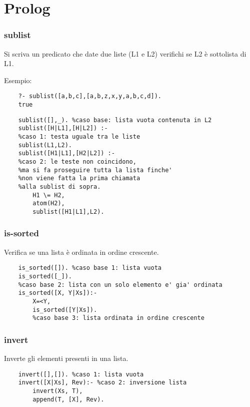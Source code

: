 \chapter{Prolog}

\subsection{sublist}

Si scriva un predicato che date due liste (L1 e L2) verifichi se L2 è sottolista di L1.

Esempio:

\begin{lstlisting}
    ?- sublist([a,b,c],[a,b,z,x,y,a,b,c,d]).
    true
\end{lstlisting}

\begin{lstlisting}
    sublist([],_). %caso base: lista vuota contenuta in L2
    sublist([H|L1],[H|L2]) :- 
    %caso 1: testa uguale tra le liste
    sublist(L1,L2).
    sublist([H1|L1],[H2|L2]) :- 
    %caso 2: le teste non coincidono, 
    %ma si fa proseguire tutta la lista finche' 
    %non viene fatta la prima chiamata 
    %alla sublist di sopra.
        H1 \= H2,
        atom(H2),
        sublist([H1|L1],L2).
\end{lstlisting}

\subsection{is-sorted}

Verifica se una lista è ordinata in ordine crescente.

\begin{lstlisting}
    is_sorted([]). %caso base 1: lista vuota 
    is_sorted([_]). 
    %caso base 2: lista con un solo elemento e' gia' ordinata
    is_sorted([X, Y|Xs]):-
        X=<Y,
        is_sorted([Y|Xs]). 
        %caso base 3: lista ordinata in ordine crescente
\end{lstlisting}

\subsection{invert}

Inverte gli elementi presenti in una lista.

\begin{lstlisting}
    invert([],[]). %caso 1: lista vuota
    invert([X|Xs], Rev):- %caso 2: inversione lista
        invert(Xs, T),
        append(T, [X], Rev).
\end{lstlisting}

